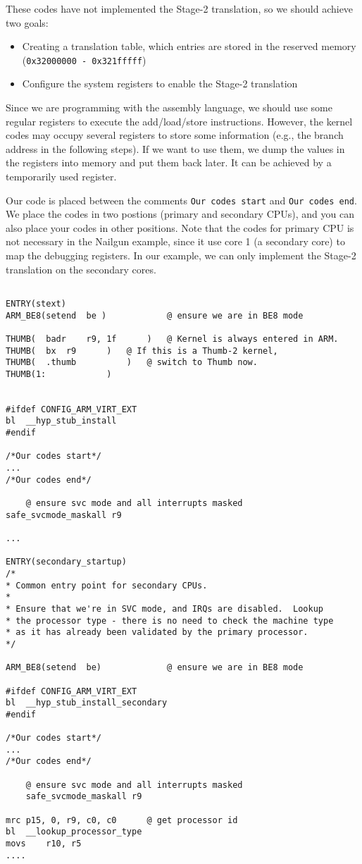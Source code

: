 These codes have not implemented the Stage-2 translation, so we should achieve two goals: 
\begin{itemize}
	\item Creating a translation table, which entries are stored in the reserved memory (\texttt{0x32000000 - 0x321fffff})
	\item Configure the system registers to enable the Stage-2 translation
\end{itemize}

Since we are programming with the assembly language, we should use some regular registers to execute the add/load/store instructions. However, the kernel codes may occupy several registers to store some information (e.g., the branch address in the following steps). If we want to use them, we dump the values in the registers into memory and put them back later. It can be achieved by a temporarily used register.



Our code is placed between the comments \texttt{Our codes start} and \texttt{Our codes end}. We place the codes in two postions (primary and secondary CPUs), and you can also place your codes in other positions.
Note that the codes for primary CPU is not necessary in the Nailgun example, since it use core 1 (a secondary core) to map the debugging registers. In our example, we can only implement the Stage-2 translation on the secondary cores.

\begin{lstlisting}

ENTRY(stext)
ARM_BE8(setend	be )			@ ensure we are in BE8 mode

THUMB(	badr	r9, 1f		)	@ Kernel is always entered in ARM.
THUMB(	bx	r9		)	@ If this is a Thumb-2 kernel,
THUMB(	.thumb			)	@ switch to Thumb now.
THUMB(1:			)


#ifdef CONFIG_ARM_VIRT_EXT
bl	__hyp_stub_install
#endif

/*Our codes start*/
...
/*Our codes end*/

	@ ensure svc mode and all interrupts masked
safe_svcmode_maskall r9

...

ENTRY(secondary_startup)
/*
* Common entry point for secondary CPUs.
*
* Ensure that we're in SVC mode, and IRQs are disabled.  Lookup
* the processor type - there is no need to check the machine type
* as it has already been validated by the primary processor.
*/

ARM_BE8(setend	be)				@ ensure we are in BE8 mode

#ifdef CONFIG_ARM_VIRT_EXT
bl	__hyp_stub_install_secondary
#endif

/*Our codes start*/
...
/*Our codes end*/

	@ ensure svc mode and all interrupts masked
	safe_svcmode_maskall r9

mrc	p15, 0, r9, c0, c0		@ get processor id
bl	__lookup_processor_type
movs	r10, r5	
....

\end{lstlisting}


